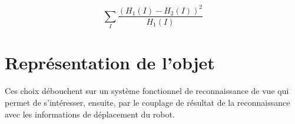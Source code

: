$$\sum _I \frac{\left(H_1(I)-H_2(I)\right)^2}{H_1(I)} $$






\section{Représentation de l'objet}

Ces choix débouchent sur un système fonctionnel de reconnaissance de
vue qui permet de s’intéresser, ensuite, par le couplage de résultat de la
reconnaissance avec les informations de déplacement du robot.

